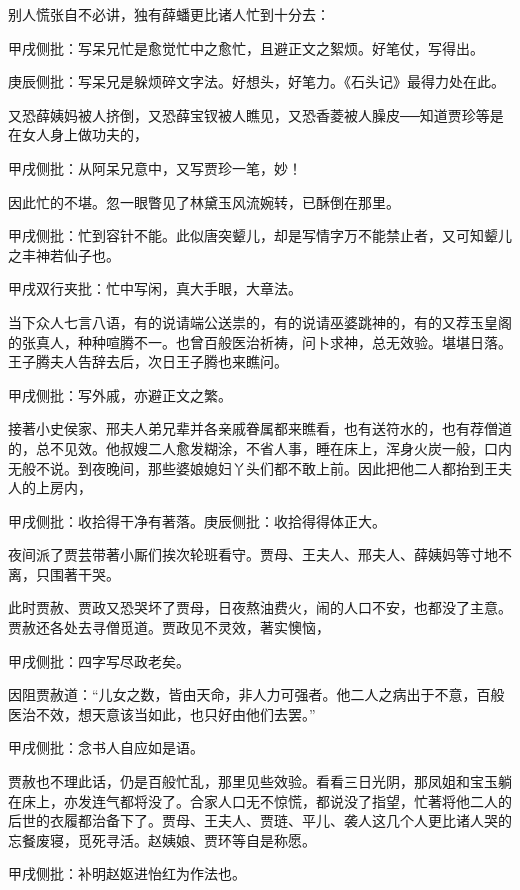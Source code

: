 \begin{parag}
    别人慌张自不必讲，独有薛蟠更比诸人忙到十分去：\begin{note}甲戌侧批：写呆兄忙是愈觉忙中之愈忙，且避正文之絮烦。好笔仗，写得出。\end{note}\begin{note}庚辰侧批：写呆兄是躲烦碎文字法。好想头，好笔力。《石头记》最得力处在此。\end{note}又恐薛姨妈被人挤倒，又恐薛宝钗被人瞧见，又恐香菱被人臊皮──知道贾珍等是在女人身上做功夫的，\begin{note}甲戌侧批：从阿呆兄意中，又写贾珍一笔，妙！\end{note}因此忙的不堪。忽一眼瞥见了林黛玉风流婉转，已酥倒在那里。\begin{note}甲戌侧批：忙到容针不能。此似唐突颦儿，却是写情字万不能禁止者，又可知颦儿之丰神若仙子也。\end{note}\begin{note}甲戌双行夹批：忙中写闲，真大手眼，大章法。\end{note}
\end{parag}


\begin{parag}
    当下众人七言八语，有的说请端公送祟的，有的说请巫婆跳神的，有的又荐玉皇阁的张真人，种种喧腾不一。也曾百般医治祈祷，问卜求神，总无效验。堪堪日落。王子腾夫人告辞去后，次日王子腾也来瞧问。\begin{note}甲戌侧批：写外戚，亦避正文之繁。\end{note}接著小史侯家、邢夫人弟兄辈并各亲戚眷属都来瞧看，也有送符水的，也有荐僧道的，总不见效。他叔嫂二人愈发糊涂，不省人事，睡在床上，浑身火炭一般，口内无般不说。到夜晚间，那些婆娘媳妇丫头们都不敢上前。因此把他二人都抬到王夫人的上房内，\begin{note}甲戌侧批：收拾得干净有著落。庚辰侧批：收拾得得体正大。\end{note}夜间派了贾芸带著小厮们挨次轮班看守。贾母、王夫人、邢夫人、薛姨妈等寸地不离，只围著干哭。
\end{parag}


\begin{parag}
    此时贾赦、贾政又恐哭坏了贾母，日夜熬油费火，闹的人口不安，也都没了主意。贾赦还各处去寻僧觅道。贾政见不灵效，著实懊恼，\begin{note}甲戌侧批：四字写尽政老矣。\end{note}因阻贾赦道：“儿女之数，皆由天命，非人力可强者。他二人之病出于不意，百般医治不效，想天意该当如此，也只好由他们去罢。”\begin{note}甲戌侧批：念书人自应如是语。\end{note}贾赦也不理此话，仍是百般忙乱，那里见些效验。看看三日光阴，那凤姐和宝玉躺在床上，亦发连气都将没了。合家人口无不惊慌，都说没了指望，忙著将他二人的后世的衣履都治备下了。贾母、王夫人、贾琏、平儿、袭人这几个人更比诸人哭的忘餐废寝，觅死寻活。赵姨娘、贾环等自是称愿。\begin{note}甲戌侧批：补明赵妪进怡红为作法也。\end{note}
\end{parag}


